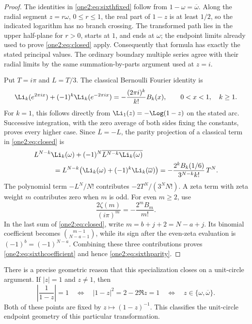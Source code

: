 \begin{proof}
The identities in \eqref{one2:eq:sixthfixed} follow from
$1-\omega=\overline\omega$.  Along the radial segment
$z=r\omega$, $0\le r\le1$, the real part of $1-z$ is at least
$1/2$, so the indicated logarithm has no branch crossing.
The transformed path lies in the upper half-plane for $r>0$,
starts at $1$, and ends at $\omega$; the endpoint limits already
used to prove \eqref{one2:eq:closed} apply.  Consequently that
formula has exactly the stated principal values.  The ordinary
boundary multiple series agree with their radial limits by the
same summation-by-parts argument used at $z=i$.

Put $T=i\pi$ and $L=T/3$.  The classical Bernoulli Fourier identity is
\begin{equation}
 \Li_k(e^{2\pi i x})+(-1)^k\Li_k(e^{-2\pi i x})
       =-\frac{(2\pi i)^k}{k!}B_k(x),
 \qquad 0<x<1,\quad k\ge1.
 \label{one2:eq:bernoullifourier}
\end{equation}
For $k=1$, this follows directly from $\Li_1(z)=-\Log(1-z)$
on the stated arc.  Successive integration, with the zero average
of both sides fixing the constants, proves every higher case.
Since $\overline L=-L$, the parity projection of a classical term
in \eqref{one2:eq:closed} is
\begin{align*}
 &L^{N-k}\Li_k(\omega)
       +(-1)^N\overline{L^{N-k}\Li_k(\omega)}\\
 &\hspace{1cm}=L^{N-k}
    \bigl(\Li_k(\omega)+(-1)^k\Li_k(\overline\omega)\bigr)
   =-\frac{2^k B_k(1/6)}{3^{N-k}k!}\,T^N.
\end{align*}
The polynomial term $-L^N/N!$ contributes
$-2T^N/(3^N N!)$.  A zeta term with zeta weight $m$ contributes
zero when $m$ is odd.  For even $m\ge2$, use
\[
 \frac{2\zeta(m)}{(i\pi)^m}=-\frac{2^m B_m}{m!}.
\]
In the last sum of \eqref{one2:eq:closed}, write
$m=b+j+2=N-a+j$.  Its binomial coefficient becomes
$\binom{m-1}{N-a-1}$, while its sign after the even-zeta evaluation
is $(-1)^b=(-1)^{N-a}$.  Combining these three contributions proves
\eqref{one2:eq:sixthcoefficient} and hence
\eqref{one2:eq:sixthparity}.
\end{proof}

There is a precise geometric reason that this specialization closes
on a unit-circle argument.  If $|z|=1$ and $z\ne1$, then
\[
 \left|\frac1{1-z}\right|=1
 \quad\Longleftrightarrow\quad
 |1-z|^2=2-2\Re z=1
 \quad\Longleftrightarrow\quad z\in\{\omega,\overline\omega\}.
\]
Both of these points are fixed by $z\mapsto(1-z)^{-1}$.
This classifies the unit-circle endpoint geometry of this particular
transformation.

